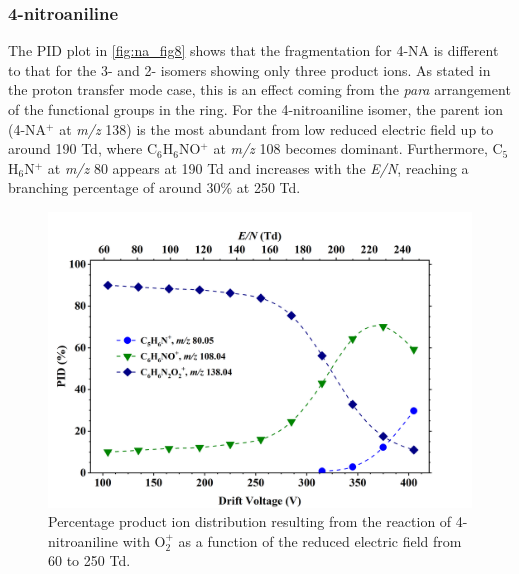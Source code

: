 \subsubsection{4-nitroaniline}
The PID plot in \autoref{fig:na_fig8} shows that the fragmentation for 4-NA is different to that for the 3- and 2- isomers showing only three product ions.  
As stated in the proton transfer mode case, this is an effect coming from the \textit{para} arrangement of the functional groups in the ring.
For the 4-nitroaniline isomer, the parent ion (4-NA$^+$ at \textit{m/z} 138) is the most abundant from low reduced electric field up to around 190 Td, where C$_6$H$_6$NO$^+$ at \textit{m/z} 108 becomes dominant.
Furthermore, C$_5$H$_6$N$^+$ at \textit{m/z} 80 appears at 190 Td and increases with the \textit{E/N}, reaching a branching percentage of around 30\% at 250 Td.

\begin{figure}%
\centering
\includegraphics[height=0.35\textheight]{pics/nitros_paper_8.png}
\caption{Percentage product ion distribution resulting from the reaction of 4-nitroaniline with O$_2^+$ as a function of the reduced electric field from 60 to 250 Td.}
\label{fig:na_fig8}
\end{figure}


